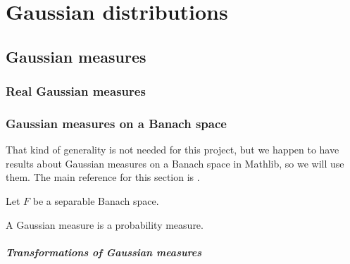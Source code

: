 \chapter{Gaussian distributions}
\label{chap:gaussian}

\section{Gaussian measures}
\label{sec:gaussian_measures}

\subsection{Real Gaussian measures}











\subsection{Gaussian measures on a Banach space}

That kind of generality is not needed for this project, but we happen to have results about Gaussian measures on a Banach space in Mathlib, so we will use them.
The main reference for this section is \cite{hairer2009introduction}.

Let $F$ be a separable Banach space.



\begin{lemma}\label{lem:IsGaussian.IsProbabilityMeasure}
  \mathlibok
A Gaussian measure is a probability measure.
\end{lemma}









\paragraph{Transformations of Gaussian measures}





